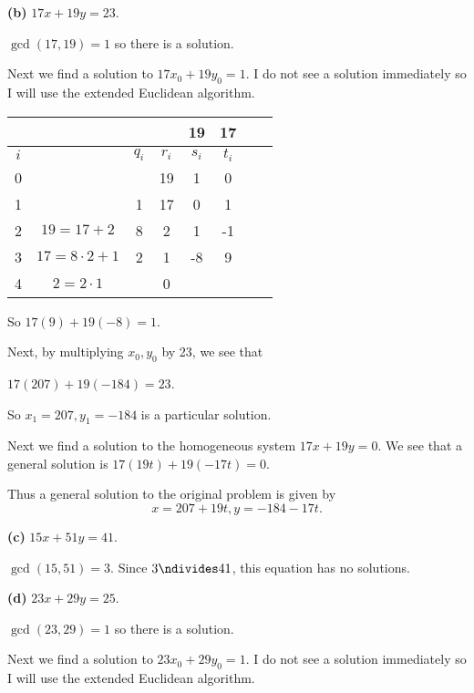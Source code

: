 \documentclass[oneside,12pt]{amsart}
\begin{document}
\bigskip

\textbf{(b)} $17x +19y = 23$.

$\gcd(17,19) = 1$ so there is a solution.

Next we find a solution to $17x_0 + 19y_0 =1$. I do not see a solution immediately
so I will use the extended Euclidean algorithm.

\begin{tabular}{|c|c|c|c|c|c|c|c|}
\hline
\quad & \quad               & \quad   & \quad & 19     & 17   \\ \hline
$i$   & \quad               & $q_{i}$ & $r_i$ & $s_i$  & $t_i$ \\ \hline\hline
0     & \quad               & \quad   & 19    &  1     & 0     \\ \hline
1     & \quad               &  1      & 17    &  0     & 1     \\ \hline
2     & $19 = 17 + 2$       &  8      &  2    &  1     &-1     \\ \hline
3     & $17 = 8\cdot 2 + 1$ &  2      &  1    & -8     & 9     \\ \hline
4     & $2 =  2\cdot 1 $    &         &  0    &        &     \\ \hline
\end{tabular}

So $17(9) + 19(-8) = 1$.

Next, by multiplying $x_0,y_0$ by 23, we see that

$17(207) + 19(-184) = 23$.

So $x_1=207, y_1=-184$ is a particular solution.

Next we find a solution to the homogeneous system $17x+19y = 0$.
We see that a general solution is $17(19t)+19(-17t) = 0$.

Thus a general solution to the original problem is given by
$$x=207+19t, y=-184-17t.$$

\bigskip

\textbf{(c)} $15x + 51y = 41$.

$\gcd(15, 51) = 3$. Since $3\ndivides 41$, this equation has no solutions.

\bigskip

\textbf{(d)} $23x + 29y = 25$.

$\gcd(23, 29) = 1$ so there is a solution.

Next we find a solution to $23x_0 + 29y_0 = 1$. I do not see a solution immediately
so I will use the extended Euclidean algorithm.
\end{document}
